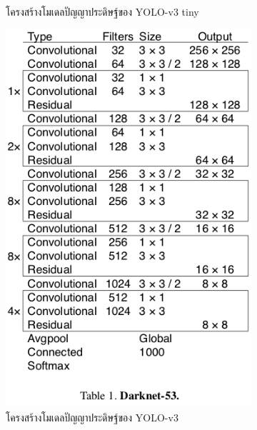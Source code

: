 \begin{figure}[!ht]
\begin{subfigure}[b]{0.2\textwidth}
	 \caption[โครงสร้างโมเดลปัญญาประดิษฐ์ของ YOLO-v3 tiny]{โครงสร้างโมเดลปัญญาประดิษฐ์ของ YOLO-v3 tiny\textsuperscript{\cite{tiny_pic}}}
        \label{fig:tiny}
    \end{subfigure}
    \begin{subfigure}[b]{0.3\textwidth}
        \centering
        \includegraphics[width=\textwidth]{chapter2/images/yolo_darknet.png}
	 \caption[โครงสร้างโมเดลปัญญาประดิษฐ์ของ YOLO-v3]{โครงสร้างโมเดลปัญญาประดิษฐ์ของ YOLO-v3\textsuperscript{\cite{darknet_pic}}}
       \label{fig:darknet}
    \end{subfigure}
    \begin{subfigure}[b]{0.5\textwidth}
        \centering

\end{subfigure}
\end{figure}
